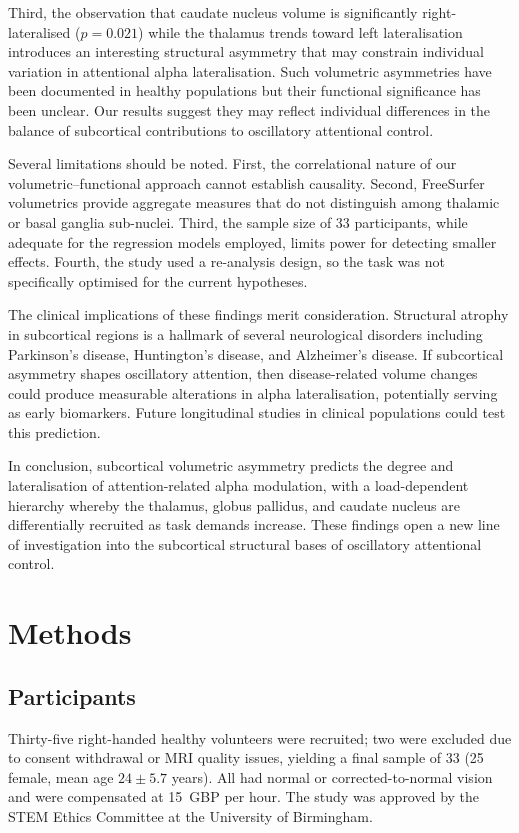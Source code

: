 \documentclass[11pt]{article}
\begin{document}
Third, the observation that caudate nucleus volume is significantly right-lateralised ($p = 0.021$) while the thalamus trends toward left lateralisation introduces an interesting structural asymmetry that may constrain individual variation in attentional alpha lateralisation. Such volumetric asymmetries have been documented in healthy populations but their functional significance has been unclear. Our results suggest they may reflect individual differences in the balance of subcortical contributions to oscillatory attentional control.

Several limitations should be noted. First, the correlational nature of our volumetric--functional approach cannot establish causality. Second, FreeSurfer volumetrics provide aggregate measures that do not distinguish among thalamic or basal ganglia sub-nuclei. Third, the sample size of 33 participants, while adequate for the regression models employed, limits power for detecting smaller effects. Fourth, the study used a re-analysis design, so the task was not specifically optimised for the current hypotheses.

The clinical implications of these findings merit consideration. Structural atrophy in subcortical regions is a hallmark of several neurological disorders including Parkinson's disease, Huntington's disease, and Alzheimer's disease. If subcortical asymmetry shapes oscillatory attention, then disease-related volume changes could produce measurable alterations in alpha lateralisation, potentially serving as early biomarkers. Future longitudinal studies in clinical populations could test this prediction.

In conclusion, subcortical volumetric asymmetry predicts the degree and lateralisation of attention-related alpha modulation, with a load-dependent hierarchy whereby the thalamus, globus pallidus, and caudate nucleus are differentially recruited as task demands increase. These findings open a new line of investigation into the subcortical structural bases of oscillatory attentional control.

\section{Methods}

\subsection{Participants}

Thirty-five right-handed healthy volunteers were recruited; two were excluded due to consent withdrawal or MRI quality issues, yielding a final sample of 33 (25 female, mean age $24 \pm 5.7$ years). All had normal or corrected-to-normal vision and were compensated at 15~GBP per hour. The study was approved by the STEM Ethics Committee at the University of Birmingham.
\end{document}
